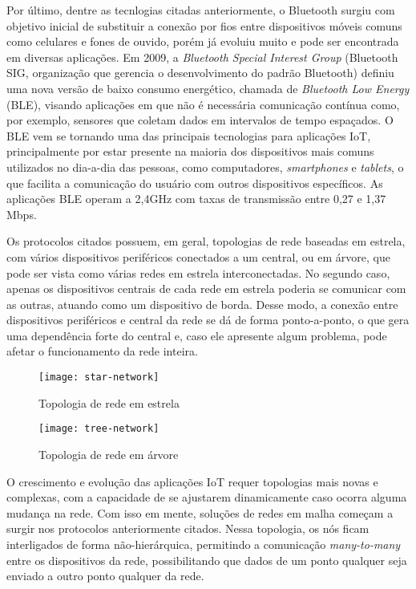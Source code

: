\documentclass[../monografia.tex]{subfiles}
\begin{document}
Por último, dentre as tecnlogias citadas anteriormente, o Bluetooth surgiu com objetivo inicial de substituir a conexão por fios entre dispositivos móveis comuns como celulares e fones de ouvido, porém já evoluiu muito e pode ser encontrada em diversas aplicações. Em 2009, a \textit{Bluetooth Special Interest Group} (Bluetooth SIG, organização que gerencia o desenvolvimento do padrão Bluetooth) definiu uma nova versão de baixo consumo energético, chamada de \textit{Bluetooth Low Energy} (BLE), visando aplicações em que não é necessária comunicação contínua como, por exemplo, sensores que coletam dados em intervalos de tempo espaçados. O BLE vem se tornando uma das principais tecnologias para aplicações IoT, principalmente por estar presente na maioria dos dispositivos mais comuns utilizados no dia-a-dia das pessoas, como computadores, \textit{smartphones} e \textit{tablets}, o que facilita a comunicação do usuário com outros dispositivos específicos. As aplicações BLE operam a 2,4GHz com taxas de transmissão entre 0,27 e 1,37 Mbps\cite{ble-datarate}.

Os protocolos citados possuem, em geral, topologias de rede baseadas em estrela, com vários dispositivos periféricos conectados a um central, ou em árvore, que pode ser vista como várias redes em estrela interconectadas. No segundo caso, apenas os dispositivos centrais de cada rede em estrela poderia se comunicar com as outras, atuando como um dispositivo de borda. Desse modo, a conexão entre dispositivos periféricos e central da rede se dá de forma ponto-a-ponto, o que gera uma dependência forte do central e, caso ele apresente algum problema, pode afetar o funcionamento da rede inteira.


\begin{figure}[h!]
\centering
\begin{minipage}{.5\textwidth}
	\centering	
	\texttt{[image: star-network]}
	\caption{Topologia de rede em estrela}
	\label{fig:Rede em estrela}
\end{minipage}%
\begin{minipage}{.5\textwidth}
	\centering
	\texttt{[image: tree-network]}
	\caption{Topologia de rede em árvore}
	\label{fig:Rede em árvore}
\end{minipage}

\end{figure}


O crescimento e evolução das aplicações IoT requer topologias mais novas e complexas, com a capacidade de se ajustarem dinamicamente caso ocorra alguma mudança na rede. Com isso em mente, soluções de redes em malha começam a surgir nos protocolos anteriormente citados. Nessa topologia, os nós ficam interligados de forma não-hierárquica, permitindo a comunicação \textit{many-to-many} entre os dispositivos da rede, possibilitando que dados de um ponto qualquer seja enviado a outro ponto qualquer da rede. 
\end{document}
